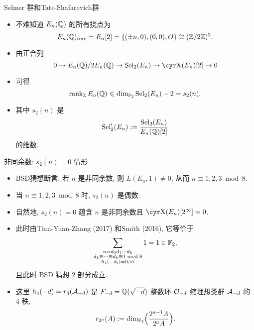 \documentclass[aspectratio=169,handout]{ctexbeamer}
\begin{document}
\begin{frame}{Selmer 群和Tate-Shafarevich群}
  \begin{itemize}
    \item 不难知道 $E_n({\mathbb{Q}})$ 的所有挠点为
    \[
      E_n({\mathbb{Q}})_{{\mathrm{tors}}}
      =E_n[2]
      =\{(\pm n,0),(0,0),O\}
      \cong({\mathbb{Z}}/2{\mathbb{Z}})^2.
    \]
    \item 由正合列
    \[
      0\ra E_n(\BQ)/2E_n(\BQ)\ra \Sel_2(E_n)\ra \Sha(E_n)[2]\ra0
    \]
    \item 可得
    \[
      \operatorname{rank}_{\mathbb{Z}} E_n({\mathbb{Q}})\leqslant \dim_{{\mathbb{F}}_2}{\mathrm{Sel}}_2(E_n)-2=s_2(n),
    \]
    \item 其中 $s_2(n)$ 是
    \[
      {\mathrm{Sel}}'_2(E_n):=\frac{{\mathrm{Sel}}_2(E_n)}{E_n({\mathbb{Q}})[2]}
    \]
    的维数.
  \end{itemize}
\end{frame}


\begin{frame}{非同余数: $s_2(n)=0$ 情形}
  \begin{itemize}
    \item BSD猜想断言: 若 $n$ 是非同余数, 则 $L(E_n,1)\ne 0$, 从而 $n\equiv 1,2,3\bmod 8$.
    \item 当 $n\equiv 1,2,3\bmod 8$ 时, $s_2(n)$ 是偶数.
    \item 自然地, $s_2(n)=0$ 蕴含 $n$ 是非同余数且 $\Sha(E_n)[2^\infty]=0$.
    \item 此时由Tian-Yuan-Zhang (2017) 和Smith (2016), 它等价于
    \[
      \sum_{\substack{n=d_0d_1\cdots d_k\\ d_1\equiv\dots\equiv d_k\equiv 1\bmod 8\\ h_4(-d_i)=0,\forall i}}1=1\in{\mathbb{F}}_2,
    \]
    且此时 BSD 猜想 $2$ 部分成立.
    \item 这里 $h_4(-d)=r_4({\mathcal{A}}_{-d})$ 是 $F_{-d}={\mathbb{Q}}(\sqrt{-d})$ 整数环 ${\mathcal{O}}_{-d}$ 缩理想类群 ${\mathcal{A}}_{-d}$ 的 $4$ 秩, 
    \[
      r_{2^a}(A):=\dim_{{\mathbb{F}}_2}\Bigl(\frac{2^{a-1}A}{2^aA}\Bigr).
    \]
  \end{itemize}
\end{frame}
\end{document}
